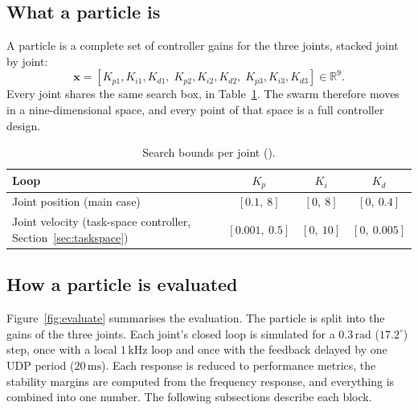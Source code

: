 \documentclass[11pt,a4paper]{article}
\newcommand{\code}[1]{\texttt{\detokenize{#1}}}
\begin{document}
\subsection{What a particle is}

A particle is a complete set of controller gains for the three joints, stacked joint by joint:
\begin{equation}
\bm x = \left[K_{p1}, K_{i1}, K_{d1},\; K_{p2}, K_{i2}, K_{d2},\; K_{p3}, K_{i3}, K_{d3}\right] \in \mathbb{R}^9.
\end{equation}
Every joint shares the same search box, in Table~\ref{tab:bounds}. The swarm therefore moves in a
nine-dimensional space, and every point of that space is a full controller design.

\begin{table}[H]
\centering
\begin{tabular}{lccc}
\toprule
Loop & $K_p$ & $K_i$ & $K_d$\\
\midrule
Joint position (main case) & $[0.1,\ 8]$ & $[0,\ 8]$ & $[0,\ 0.4]$\\
Joint velocity (task-space controller, Section~\ref{sec:taskspace}) & $[0.001,\ 0.5]$ & $[0,\ 10]$ & $[0,\ 0.005]$\\
\bottomrule
\end{tabular}
\caption{Search bounds per joint (\code{optimization.bounds}).}
\label{tab:bounds}
\end{table}

\subsection{How a particle is evaluated}

Figure~\ref{fig:evaluate} summarises the evaluation. The particle is split into the gains of the three
joints. Each joint's closed loop is simulated for a $0.3\,\mathrm{rad}$ ($17.2^\circ$) step, once with a
local $1\,\mathrm{kHz}$ loop and once with the feedback delayed by one UDP period ($20\,\mathrm{ms}$). Each
response is reduced to performance metrics, the stability margins are computed from the frequency response,
and everything is combined into one number. The following subsections describe each block.
\end{document}
